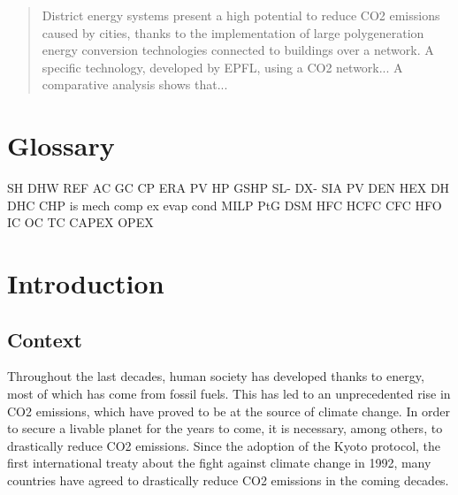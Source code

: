 \documentclass{article}
\begin{document}


\newpage
\null
\thispagestyle{empty} %
\clearpage

\listoftodos
\newpage

\begin{abstract}
District energy systems present a high potential to reduce CO2 emissions caused by cities, thanks to the implementation of large polygeneration energy conversion technologies connected to buildings over a network.
A specific technology, developed by EPFL, using a CO2 network...
A comparative analysis shows that...
\end{abstract}

\newpage
\tableofcontents
\thispagestyle{empty} 




\setcounter{page}{1}
\renewcommand{\thepage}{\arabic{page}}
\newpage

\section*{Glossary}
SH
DHW
REF
AC
GC
CP
ERA
PV
HP
GSHP
SL-
DX-
SIA
PV
DEN
HEX
DH
DHC
CHP
is
mech
comp
ex
evap 
cond
MILP
PtG
DSM
HFC
HCFC
CFC
HFO
IC
OC
TC
CAPEX
OPEX

\section{Introduction}

\subsection{Context}
Throughout the last decades, human society has developed thanks to energy, most of which has come from fossil fuels. This has led to an unprecedented rise in CO2 emissions, which have proved to be at the source of climate change. In order to secure a livable planet for the years to come, it is necessary, among others, to drastically reduce CO2 emissions\cite{ipccSummaryPolicymakersIPCC2018}. Since the adoption of the Kyoto protocol, the first international treaty about the fight against climate change in 1992, many countries have agreed to drastically reduce CO2 emissions in the coming decades.\\
\end{document}
